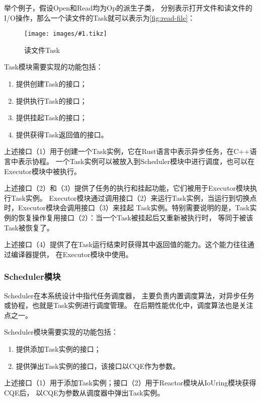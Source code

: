 \documentclass[supercite]{HustGraduPaper}
\newcommand{\cfig}[3]{
  \begin{figure}[htb]
    \centering
    \texttt{[image: images/\#1.tikz]}
    \caption{#3}
    \label{fig:#1}
  \end{figure}
}
\newcommand{\rfig}[1]{\autoref{fig:#1}}
\theoremstyle{definition}
\begin{document}
举个例子，假设Open和Read均为Op的派生子类，
分别表示打开文件和读文件的I/O操作，那么一个读文件的Task就可以表示为\rfig{read-file}：

\cfig{read-file}{0.4}{读文件Task}

Task模块需要实现的功能包括：

\begin{enumerate}
  \item 提供创建Task的接口；
  \item 提供执行Task的接口；
  \item 提供挂起Task的接口；
  \item 提供获得Task返回值的接口。
\end{enumerate}

上述接口（1）用于创建一个Task实例，它在Rust语言中表示异步任务，在C++语言中表示协程。
一个Task实例可以被放入到Scheduler模块中进行调度，也可以在Executor模块中被执行。\par

上述接口（2）和（3）提供了任务的执行和挂起功能，它们被用于Executor模块执行Task实例。
Executor模块通过调用接口（2）来运行Task实例，当运行到切换点时，Executor模块会调用接口（3）来挂起
Task实例。特别需要说明的是，Task实例的恢复操作复用接口（2）：当一个Task被挂起后又重新被执行时，
等同于被该Task被恢复了。\par

上述接口（4）提供了在Task运行结束时获得其中返回值的能力。这个能力往往通过编译器提供，
在Executor模块中使用。\par

\subsubsection{Scheduler模块}

Scheduler在本系统设计中指代任务调度器，
主要负责内置调度算法，对异步任务或协程，也就是Task实例进行调度管理。
在后期性能优化中，调度算法也是关注点之一。\par

Scheduler模块需要实现的功能包括：

\begin{enumerate}
  \item 提供添加Task实例的接口；
  \item 提供弹出Task实例的接口，该接口以CQE作为参数。
\end{enumerate}

上述接口（1）用于添加Task实例；接口（2）用于Reactor模块从IoUring模块获得CQE后，
以CQE为参数从调度器中弹出Task实例。\par
\end{document}
